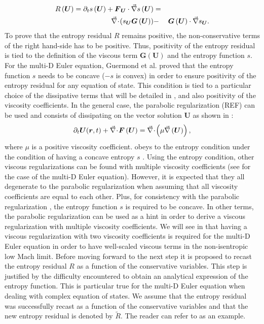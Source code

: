 \begin{enumerate}
\begin{eqnarray}
R\left(\boldsymbol{U}\right) = \partial_t s\left(\boldsymbol{U}\right) + \boldsymbol{F}_{\boldsymbol{U}} \cdot \vec{\nabla} s \left(\boldsymbol{U}\right) &=& \nonumber \\
\vec{\nabla}\! \cdot \! ( s_{\boldsymbol{U}} \boldsymbol{G}  \left( \boldsymbol{U} \right) ) &-& \boldsymbol{G}  \left( \boldsymbol{U} \right) \cdot \vec{\nabla} s_{\boldsymbol{U}}.
\end{eqnarray}
%
To prove that the entropy residual $R$ remains positive, the non-conservative terms of the right hand-side has to be positive. Thus, positivity of the entropy residual is tied to the definition of the viscous term $\boldsymbol{G}  \left( \boldsymbol{U} \right)$ and the entropy function $s$. For the multi-D Euler equation, Guermond et al. \cite{jlg} proved that the entropy function $s$ needs to be concave ($-s$ is convex) in order to ensure positivity of the entropy residual for any equation of state. This condition is tied to a particular choice of the dissipative terms that will be detailed in , and also positivity of the viscosity coefficients. In the general case, the parabolic regularization (REF) can be used and consists of dissipating on the vector solution $\boldsymbol{U}$ as shown in : 
%
\begin{equation}\label{eq:hyp_syst4_sct1b}
\partial_t \boldsymbol{U}(\boldsymbol r,t) + \vec{\nabla}\! \cdot \! \boldsymbol{F} \left( \boldsymbol{U} \right) = \vec{\nabla}\! \cdot \! \left( \mu \vec{\nabla} \left( \boldsymbol{U} \right) \right),
\end{equation}
%
where $\mu$ is a positive viscosity coefficient.  obeys to the entropy condition under the condition of having a concave entropy $s$ \cite{Parabolic}. Using the entropy condition, other viscous regularizations can be found with multiple viscosity coefficients (see \cite{jlg} for the case of the multi-D Euler equation). However, it is expected that they all degenerate to the parabolic regularization when assuming that all viscosity coefficients are equal to each other. Plus, for consistency with the parabolic regularization \cite{Parabolic}, the entropy function $s$ is required to be concave. In other terms, the parabolic regularization can be used as a hint in order to derive a viscous regularization with multiple viscosity coefficients. We will see in  that having a viscous regularization with two viscosity coefficients is required for the multi-D Euler equation in order to have well-scaled viscous terms in the non-isentropic low Mach limit. Before moving forward to the next step it is proposed to recast the entropy residual $R$ as a function of the conservative variables. This step is justified by the difficulty encountered to obtain an analytical expression of the entropy function. This is particular true for the multi-D Euler equation when dealing with complex equation of states. We assume that the entropy residual was successfully recast as a function of the conservative variables and that the new entropy residual is denoted by $\tilde{R}$. The reader can refer to  as an example.

\end{enumerate}
